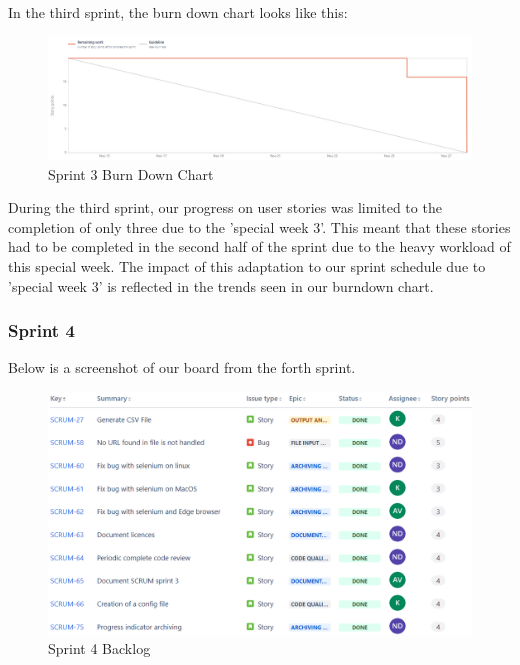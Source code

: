 In the third sprint, the burn down chart looks like this:
\begin{figure}[h!]
    \centering
    \includegraphics[width=1\textwidth]{pictures/Scrum/Sprint 3/Sprint3_burndownchart}
    \caption{Sprint 3 Burn Down Chart}
    \label{fig:sprint_3_bunrdown_chart}
\end{figure}

During the third sprint, our progress on user stories was limited to the completion of only three due to the 'special week 3'.
This meant that these stories had to be completed in the second half of the sprint due to the heavy workload of this special week.
The impact of this adaptation to our sprint schedule due to 'special week 3' is reflected in the trends seen in our burndown chart.
\clearpage

\subsubsection{Sprint 4}
Below is a screenshot of our board from the forth sprint.
\begin{figure}[h!]
    \centering
    \includegraphics[width=1\textwidth]{pictures/Scrum/Sprint 4/Sprint4_Backlog}
    \caption{Sprint 4 Backlog}
    \label{fig:sprint_4_backlog}
\end{figure}


